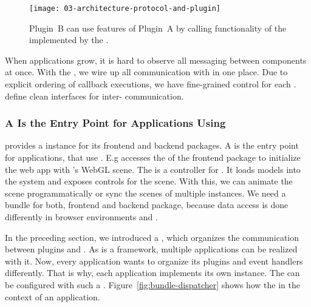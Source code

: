 \documentclass[../../ClassicThesis.tex]{subfiles}
\begin{document}
\begin{figure}[h]
  \centering
  \texttt{[image: 03-architecture-protocol-and-plugin]}
  \caption{Plugin~B can use features of Plugin~A by calling functionality of the  implemented by the .}
  \label{fig:protocol-and-plugin}
\end{figure}

When applications grow, it is hard to observe all messaging between
components at once. With the , we wire up all
communication with  in one place. Due to explicit
ordering of callback executions, we have fine-grained control for each
.  define clean interfaces for
inter- communication.



\subsubsection{A  Is the Entry Point for Applications Using {\convertify}}
\label{sec:bundle-entry-point}

{\convertify} provides a  instance for its frontend and
backend packages. A  is the entry point for
applications, that use {\convertify}. E.g {\platener} accesses the
 of the frontend package to initialize the web app with
{\convertify}'s WebGL scene. The  is a controller for
{\convertify}. It loads models into the system and exposes controls
for the scene. With this, we can animate the scene programmatically or
sync the scenes of multiple {\convertify} instances. We need a bundle
for both, frontend and backend package, because data access is done
differently in browser environments and {\nodejs}.

In the preceding section, we introduced a , which
organizes the communication between plugins and {\convertify}. As
{\convertify} is a framework, multiple applications can be realized
with it. Now, every application wants to organize its plugins and
event handlers differently. That is why, each application implements
its own  instance. The  can be
configured with such a .
Figure~\ref{fig:bundle-dispatcher} shows how the  in the
context of an application.
\end{document}
